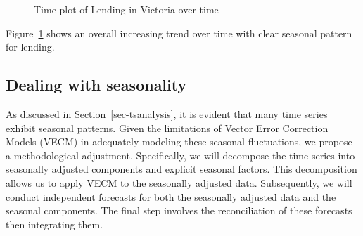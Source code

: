\documentclass[
  11pt,
  a4paper,
]{article}
\begin{document}
\begin{figure}


\caption{\label{fig-lendingtrend}Time plot of Lending in Victoria over
time}

\end{figure}%

Figure~\ref{fig-lendingtrend} shows an overall increasing trend over
time with clear seasonal pattern for lending.

\subsection{Dealing with seasonality}\label{dealing-with-seasonality}

As discussed in Section~\ref{sec-tsanalysis}, it is evident that many
time series exhibit seasonal patterns. Given the limitations of Vector
Error Correction Models (VECM) in adequately modeling these seasonal
fluctuations, we propose a methodological adjustment. Specifically, we
will decompose the time series into seasonally adjusted components and
explicit seasonal factors. This decomposition allows us to apply VECM to
the seasonally adjusted data. Subsequently, we will conduct independent
forecasts for both the seasonally adjusted data and the seasonal
components. The final step involves the reconciliation of these
forecasts then integrating them.
\end{document}
